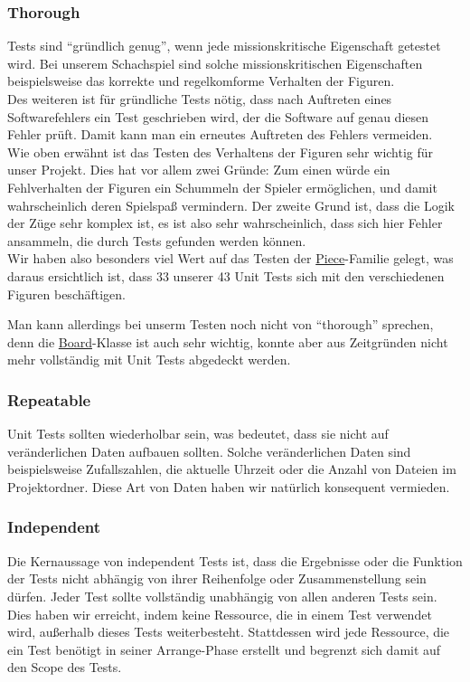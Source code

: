 \documentclass[
10pt, %
a4paper, %
oneside, %
headinclude,footinclude, %
BCOR5mm, %
]{scrartcl}
\begin{document}
\begin{onehalfspace}
\subsubsection{Thorough}
Tests sind \enquote{gründlich genug}, wenn jede missionskritische Eigenschaft getestet wird. Bei unserem Schachspiel sind solche missionskritischen Eigenschaften beispielsweise das korrekte und regelkomforme Verhalten der Figuren. 
\\
Des weiteren ist für gründliche Tests nötig, dass nach Auftreten eines Softwarefehlers ein Test geschrieben wird, der die Software auf genau diesen Fehler prüft. Damit kann man ein erneutes Auftreten des Fehlers vermeiden.
\\
Wie oben erwähnt ist das Testen des Verhaltens der Figuren sehr wichtig für unser Projekt. Dies hat vor allem zwei Gründe:
Zum einen würde ein Fehlverhalten der Figuren ein Schummeln der Spieler ermöglichen, und damit wahrscheinlich deren Spielspaß vermindern. 
Der zweite Grund ist, dass die Logik der Züge sehr komplex ist, es ist also sehr wahrscheinlich, dass sich hier Fehler ansammeln, die durch Tests gefunden werden können.
\\
Wir haben also besonders viel Wert auf das Testen der \href{https://github.com/schmida736/Chess-AdvancedSE/blob/main/Chess-AdvancedSE/Game\%20Elements/Pieces/Piece.cs}{Piece}-Familie gelegt, was daraus ersichtlich ist, dass 33 unserer 43 Unit Tests sich mit den verschiedenen Figuren beschäftigen.

Man kann allerdings bei unserm Testen noch nicht von \enquote{thorough} sprechen, denn die \href{https://github.com/schmida736/Chess-AdvancedSE/blob/main/Chess-AdvancedSE/Game\%20Elements/Board.cs}{Board}-Klasse ist auch sehr wichtig, konnte aber aus Zeitgründen nicht mehr vollständig mit Unit Tests abgedeckt werden.

\subsubsection{Repeatable}
Unit Tests sollten wiederholbar sein, was bedeutet, dass sie nicht auf veränderlichen Daten aufbauen sollten. Solche veränderlichen Daten sind beispielsweise Zufallszahlen, die aktuelle Uhrzeit oder die Anzahl von Dateien im Projektordner. Diese Art von Daten haben wir natürlich konsequent vermieden.
\subsubsection{Independent}
Die Kernaussage von independent Tests ist, dass die Ergebnisse oder die Funktion der Tests nicht abhängig von ihrer Reihenfolge oder Zusammenstellung sein dürfen. Jeder Test sollte vollständig unabhängig von allen anderen Tests sein. Dies haben wir erreicht, indem keine Ressource, die in einem Test verwendet wird, außerhalb dieses Tests weiterbesteht. Stattdessen wird jede Ressource, die ein Test benötigt in seiner Arrange-Phase erstellt und begrenzt sich damit auf den Scope des Tests.

\end{onehalfspace}
\end{document}
